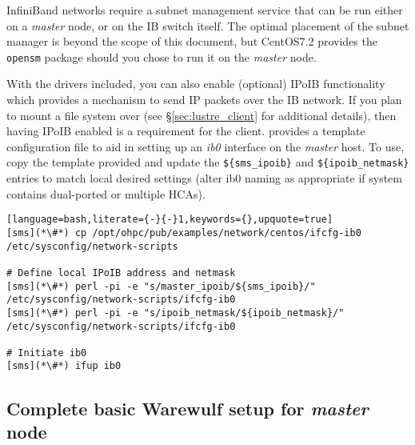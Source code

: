\documentclass[letterpaper]{article}
\newcommand{\baseOS}{CentOS7.2}
\begin{document}
\begin{center}
  \begin{tcolorbox}[]
InfiniBand networks require a subnet management service that can be run either
on a {\em master} node, or on the IB switch itself. The optimal placement of the
subnet manager is beyond the scope of this document, but \baseOS{} provides the
\texttt{opensm} package should you chose to run it on the {\em master} node.
\end{tcolorbox}
\end{center}

With the \InfiniBand{} drivers included, you can also enable (optional) IPoIB functionality
which provides a mechanism to send IP packets over the IB network. If you plan
to mount a \Lustre{} file system over \InfiniBand{} (see \S\ref{sec:lustre_client}
for additional details), then having IPoIB enabled is a requirement for the
\Lustre{} client. \OHPC{} provides a template configuration file to aid in setting up
an {\em ib0} interface on the {\em master} host. To use, copy the template
provided and update the \texttt{\$\{sms\_ipoib\}} and
\texttt{\$\{ipoib\_netmask\}} entries to match local desired settings (alter ib0
naming as appropriate if system contains dual-ported or multiple HCAs). 

\begin{lstlisting}[language=bash,literate={-}{-}1,keywords={},upquote=true]
[sms](*\#*) cp /opt/ohpc/pub/examples/network/centos/ifcfg-ib0 /etc/sysconfig/network-scripts

# Define local IPoIB address and netmask
[sms](*\#*) perl -pi -e "s/master_ipoib/${sms_ipoib}/" /etc/sysconfig/network-scripts/ifcfg-ib0
[sms](*\#*) perl -pi -e "s/ipoib_netmask/${ipoib_netmask}/" /etc/sysconfig/network-scripts/ifcfg-ib0

# Initiate ib0
[sms](*\#*) ifup ib0
\end{lstlisting}

\vspace*{-0.15cm}
\subsection{Complete basic Warewulf setup for {\em master} node} \label{sec:setup_ww}


\end{document}
